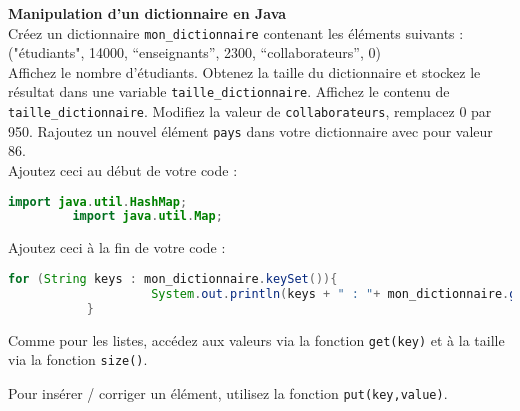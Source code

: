     \begin{Exercice}[15 minutes] \textbf{Manipulation d'un dictionnaire en Java}\\
      	Créez un dictionnaire \lstinline{mon_dictionnaire} contenant les éléments suivants : \\
      	
      	("étudiants", 14000, ``enseignants'', 2300, ``collaborateurs'', 0) \\
      	
          Affichez le nombre d'étudiants. Obtenez la taille du dictionnaire et stockez le résultat dans une variable \lstinline{taille_dictionnaire}. Affichez le contenu de \lstinline{taille_dictionnaire}. 
          Modifiez la valeur de \lstinline{collaborateurs}, remplacez 0 par 950. Rajoutez un nouvel élément \lstinline{pays} dans votre dictionnaire avec pour valeur 86.\\
      	
      	Ajoutez ceci au début de votre code :
       
      	\begin{lstlisting}[language=Java]
             import java.util.HashMap;
	     import java.util.Map; \end{lstlisting}
	     
	     Ajoutez ceci à la fin de votre code :
	     
	    \begin{lstlisting}[language=Java]
             for (String keys : mon_dictionnaire.keySet()){
            		System.out.println(keys + " : "+ mon_dictionnaire.get(keys));
	       } \end{lstlisting} 
    
        \begin{conseil}
           Comme pour les listes, accédez aux valeurs via la fonction \lstinline{get(key)} et à la taille via la fonction \lstinline{size()}.
            
           Pour insérer / corriger un élément, utilisez la fonction \lstinline{put(key,value)}.
		     
        \end{conseil}
        
        \begin{solution}
            
        \end{solution}
    \end{Exercice}
    

